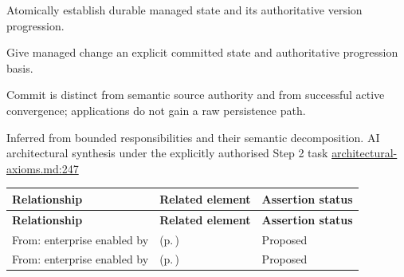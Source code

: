 
Atomically establish durable managed state and its authoritative version progression.



Give managed change an explicit committed state and authoritative progression basis.



Commit is distinct from semantic source authority and from successful active convergence; applications do not gain a raw persistence path.


Inferred from bounded responsibilities and their semantic decomposition. AI architectural synthesis under the explicitly authorised Step 2 task \hyperref[evidence:27549d51551beae6]{architectural-axioms.md:247}
\begingroup\small\setlength{\TableWidth}{\dimexpr\linewidth-6\tabcolsep-4\arrayrulewidth\relax}
\begin{longtable}{|>{\raggedright\arraybackslash}p{0.27\TableWidth}|>{\raggedright\arraybackslash}p{0.48\TableWidth}|>{\raggedright\arraybackslash}p{0.25\TableWidth}|}
\hline\rowcolor{TableHead}\textbf{Relationship} & \textbf{Related element} & \textbf{Assertion status}\\\hline\endfirsthead
\hline\rowcolor{TableHead}\textbf{Relationship} & \textbf{Related element} & \textbf{Assertion status}\\\hline\endhead
\hline\endfoot
From: enterprise enabled by & \nameref{cap:bec-patient-clinical-record} (p.\,\pageref{cap:bec-patient-clinical-record}) & Proposed\\\hline
From: enterprise enabled by & \nameref{cap:bec-governed-reference-dataset-administration} (p.\,\pageref{cap:bec-governed-reference-dataset-administration}) & Proposed\\\hline
\end{longtable}\endgroup

